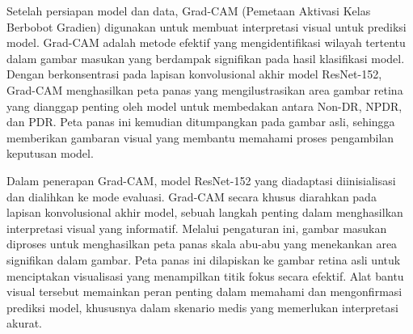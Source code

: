 Setelah persiapan model dan data, Grad-CAM (Pemetaan Aktivasi Kelas Berbobot Gradien) digunakan untuk membuat interpretasi visual untuk prediksi model. Grad-CAM adalah metode efektif yang mengidentifikasi wilayah tertentu dalam gambar masukan yang berdampak signifikan pada hasil klasifikasi model. Dengan berkonsentrasi pada lapisan konvolusional akhir model ResNet-152, Grad-CAM menghasilkan peta panas yang mengilustrasikan area gambar retina yang dianggap penting oleh model untuk membedakan antara Non-DR, NPDR, dan PDR. Peta panas ini kemudian ditumpangkan pada gambar asli, sehingga memberikan gambaran visual yang membantu memahami proses pengambilan keputusan model.

Dalam penerapan Grad-CAM, model ResNet-152 yang diadaptasi diinisialisasi dan dialihkan ke mode evaluasi. Grad-CAM secara khusus diarahkan pada lapisan konvolusional akhir model, sebuah langkah penting dalam menghasilkan interpretasi visual yang informatif. Melalui pengaturan ini, gambar masukan diproses untuk menghasilkan peta panas skala abu-abu yang menekankan area signifikan dalam gambar. Peta panas ini dilapiskan ke gambar retina asli untuk menciptakan visualisasi yang menampilkan titik fokus secara efektif. Alat bantu visual tersebut memainkan peran penting dalam memahami dan mengonfirmasi prediksi model, khususnya dalam skenario medis yang memerlukan interpretasi akurat.

